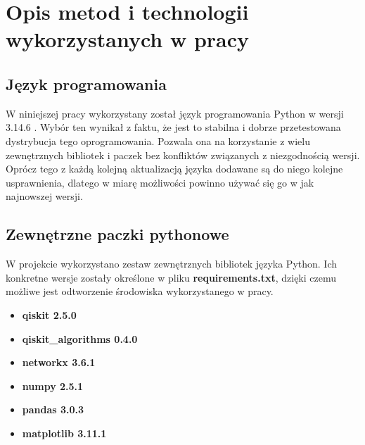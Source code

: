 \chapter{Opis metod i technologii wykorzystanych w pracy}

\section{Język programowania}

W niniejszej pracy wykorzystany został język programowania Python w wersji 3.14.6 \cite{python}. Wybór ten wynikał z faktu, że jest to stabilna i dobrze przetestowana dystrybucja tego oprogramowania. Pozwala ona na korzystanie z wielu zewnętrznych bibliotek i paczek bez konfliktów związanych z niezgodnością wersji. Oprócz tego z każdą kolejną aktualizacją języka dodawane są do niego kolejne usprawnienia, dlatego w miarę możliwości powinno używać się go w jak najnowszej wersji.

\section{Zewnętrzne paczki pythonowe}

W projekcie wykorzystano zestaw zewnętrznych bibliotek języka Python. Ich konkretne wersje zostały określone w pliku \textbf{requirements.txt}, dzięki czemu możliwe jest odtworzenie środowiska wykorzystanego w pracy.

\begin{itemize}

\item \textbf{qiskit 2.5.0} \cite{qiskit}
\item \textbf{qiskit\_algorithms 0.4.0} \cite{qiskit_algorithms}
\item \textbf{networkx 3.6.1} \cite{networkx}
\item \textbf{numpy 2.5.1} \cite{numpy}
\item \textbf{pandas 3.0.3} \cite{pandas}
\item \textbf{matplotlib 3.11.1} \cite{matplotlib}

\end{itemize}
